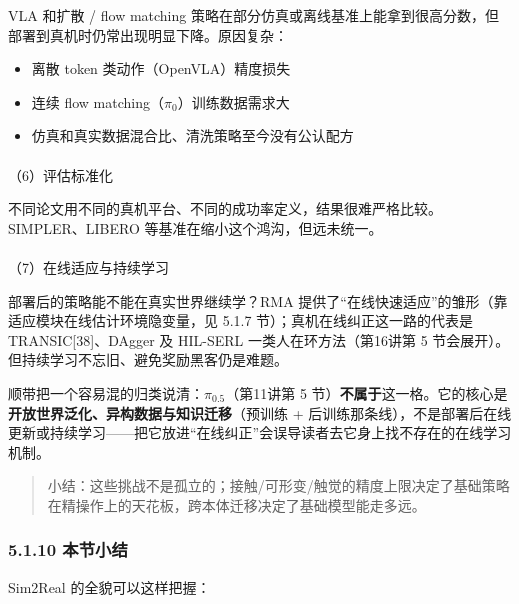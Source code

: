 \documentclass[
  chinese,
]{ctexart}
\makeatletter
\let\oldparagraph\paragraph
\renewcommand{\paragraph}{
    \@ifstar
      \xxxParagraphStar
      \xxxParagraphNoStar
  }
\newcommand{\xxxParagraphStar}[1]{\oldparagraph*{#1}\mbox{}}
\newcommand{\xxxParagraphNoStar}[1]{\oldparagraph{#1}\mbox{}}
\providecommand{\tightlist}{%
  \setlength{\itemsep}{0pt}\setlength{\parskip}{0pt}}
\makeatother
\begin{document}
VLA 和扩散 / flow matching
策略在部分仿真或离线基准上能拿到很高分数，但部署到真机时仍常出现明显下降。原因复杂：

\begin{itemize}
\tightlist
\item
  离散 token 类动作（OpenVLA）精度损失
\item
  连续 flow matching（\(\pi_0\)）训练数据需求大
\item
  仿真和真实数据混合比、清洗策略至今没有公认配方
\end{itemize}

\paragraph{（6）评估标准化}\label{ux8bc4ux4f30ux6807ux51c6ux5316}

不同论文用不同的真机平台、不同的成功率定义，结果很难严格比较。SIMPLER、LIBERO
等基准在缩小这个鸿沟，但远未统一。

\paragraph{（7）在线适应与持续学习}\label{ux5728ux7ebfux9002ux5e94ux4e0eux6301ux7eedux5b66ux4e60}

部署后的策略能不能在真实世界继续学？RMA
提供了``在线快速适应''的雏形（靠适应模块在线估计环境隐变量，见 5.1.7
节）；真机在线纠正这一路的代表是 TRANSIC{[}38{]}、DAgger 及 HIL-SERL
一类人在环方法（第16讲第 5
节会展开）。但持续学习不忘旧、避免奖励黑客仍是难题。

顺带把一个容易混的归类说清：\(\pi_{0.5}\)（第11讲第 5
节）\textbf{不属于}这一格。它的核心是\textbf{开放世界泛化、异构数据与知识迁移}（预训练
+
后训练那条线），不是部署后在线更新或持续学习------把它放进``在线纠正''会误导读者去它身上找不存在的在线学习机制。

\begin{quote}
小结：这些挑战不是孤立的；接触/可形变/触觉的精度上限决定了基础策略在精操作上的天花板，跨本体迁移决定了基础模型能走多远。
\end{quote}

\subsubsection{5.1.10 本节小结}\label{ux672cux8282ux5c0fux7ed3-3}

Sim2Real 的全貌可以这样把握：
\end{document}
